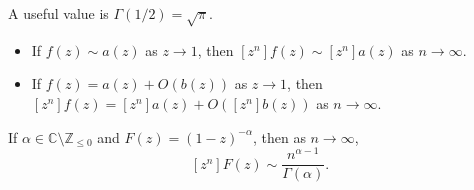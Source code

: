 A useful value is \(\Gamma(1/2) = \sqrt{\pi}\).

\begin{theorem}
    \begin{itemize}
        \item If \(f(z) \sim a(z)\) as \(z \to 1\), then \([z^n] f(z) \sim [z^n] a(z)\) as \(n \to \infty\).
        \item If \(f(z) = a(z) + O(b(z))\) as \(z \to 1\), then \([z^n] f(z) = [z^n] a(z) + O([z^n] b(z))\) as \(n \to \infty\).
    \end{itemize}
\end{theorem}

\begin{lemma}
    If \(\alpha \in \mathbb{C} \setminus \mathbb{Z}_{\le 0}\) and \(F(z) = (1 - z)^{-\alpha}\), then as \(n \to \infty\),
    \[
        [z^n] F(z) \sim \frac{n^{\alpha - 1}}{\Gamma(\alpha)}.
    \]
\end{lemma}